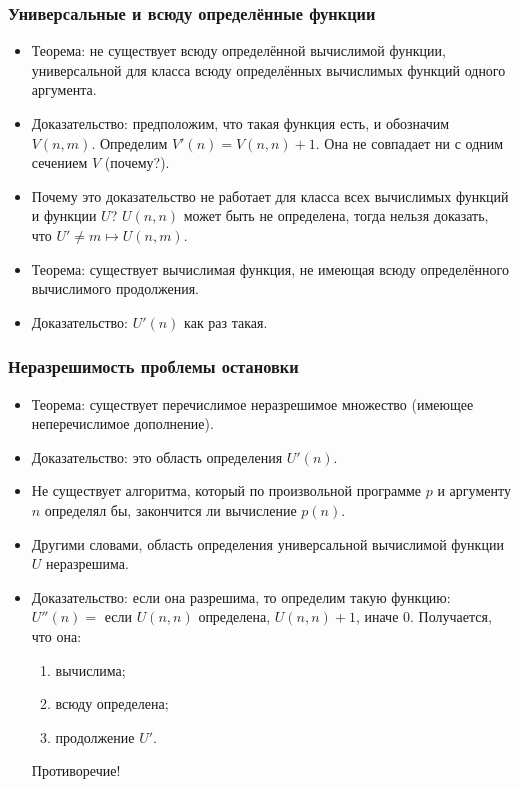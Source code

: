 \documentclass[10pt]{beamer}
\begin{document}
\begin{frame}
    \frametitle{Универсальные и всюду определённые функции}
    \begin{itemize}
        \item Теорема: не существует всюду определённой вычислимой функции, универсальной для класса всюду определённых вычислимых функций одного аргумента.
        \item Доказательство: предположим, что такая функция есть, и обозначим $V(n,m)$. Определим $V'(n) = V(n,n) + 1$. \pause Она не совпадает ни с одним сечением $V$ (почему?).
        \pause
        \item Почему это доказательство не работает для класса всех вычислимых функций и функции $U$? \pause $U(n,n)$ может быть не определена, тогда нельзя доказать, что $U' \neq m \mapsto U(n,m)$.
        \pause
        \item Теорема: существует вычислимая функция, не имеющая всюду определённого вычислимого продолжения.
        \item Доказательство: $U'(n)$ как раз такая.
    \end{itemize}
\end{frame}

\begin{frame}
    \frametitle{Неразрешимость проблемы остановки}
    \begin{itemize}
        \item Теорема: существует перечислимое неразрешимое множество (имеющее неперечислимое дополнение).
        \pause
        \item Доказательство: это область определения $U'(n)$.
        \pause
        \item Не существует алгоритма, который по произвольной программе $p$ и аргументу $n$ определял бы, закончится ли вычисление $p(n)$.
        \item Другими словами, область определения универсальной вычислимой функции $U$ неразрешима.
        \pause
        \item Доказательство: если она разрешима, то определим такую функцию: 
        $U''(n) = $ если $U(n,n)$ определена, $U(n,n)+1$,  иначе $0$. Получается, что она:
        \begin{enumerate}
            \item вычислима;
            \item всюду определена;
            \item продолжение $U'$.
        \end{enumerate}
        Противоречие!
    \end{itemize}
\end{frame}
\end{document}
